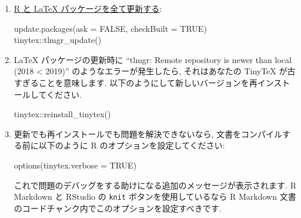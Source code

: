 \documentclass[
  xelatex,ja=standard,jafont=noto]{bxjsreport}
\newenvironment{Shaded}{\begin{snugshade}}{\end{snugshade}}
\newcommand{\AttributeTok}[1]{\textcolor[rgb]{0.77,0.63,0.00}{#1}}
\newcommand{\ConstantTok}[1]{\textcolor[rgb]{0.00,0.00,0.00}{#1}}
\newcommand{\FunctionTok}[1]{\textcolor[rgb]{0.00,0.00,0.00}{#1}}
\newcommand{\NormalTok}[1]{#1}
\newcommand{\SpecialCharTok}[1]{\textcolor[rgb]{0.00,0.00,0.00}{#1}}
\begin{document}
\begin{enumerate}
\def\labelenumi{\arabic{enumi}.}
\item
  \href{https://yihui.org/en/2017/05/when-in-doubt-upgrade/}{R と LaTeX
  パッケージを全て更新する}:

\begin{Shaded}
\begin{Highlighting}[numbers=left,,]
\FunctionTok{update.packages}\NormalTok{(}\AttributeTok{ask =} \ConstantTok{FALSE}\NormalTok{, }\AttributeTok{checkBuilt =} \ConstantTok{TRUE}\NormalTok{)}
\NormalTok{tinytex}\SpecialCharTok{::}\FunctionTok{tlmgr\_update}\NormalTok{()}
\end{Highlighting}
\end{Shaded}
\item
  LaTeX パッケージの更新時に ``tlmgr: Remote repository is newer than
  local (2018 \textless{} 2019)'' のようなエラーが発生したら,
  それはあなたの TinyTeX が古すぎることを意味します.
  以下のようにして新しいバージョンを再インストールしてください.

\begin{Shaded}
\begin{Highlighting}[numbers=left,,]
\NormalTok{tinytex}\SpecialCharTok{::}\FunctionTok{reinstall\_tinytex}\NormalTok{()}
\end{Highlighting}
\end{Shaded}
\item
  更新でも再インストールでも問題を解決できないなら,
  文書をコンパイルする前に以下のように R のオプションを設定してください:

\begin{Shaded}
\begin{Highlighting}[numbers=left,,]
\FunctionTok{options}\NormalTok{(}\AttributeTok{tinytex.verbose =} \ConstantTok{TRUE}\NormalTok{)}
\end{Highlighting}
\end{Shaded}

  これで問題のデバッグをする助けになる追加のメッセージが表示されます. R
  Markdown と RStudio の \texttt{knit} ボタンを使用しているなら R
  Markdown 文書のコードチャンク内でこのオプションを設定すべきです.

\begin{Shaded}
\begin{Highlighting}[]

\end{Highlighting}
\end{Shaded}


\end{enumerate}
\end{document}
